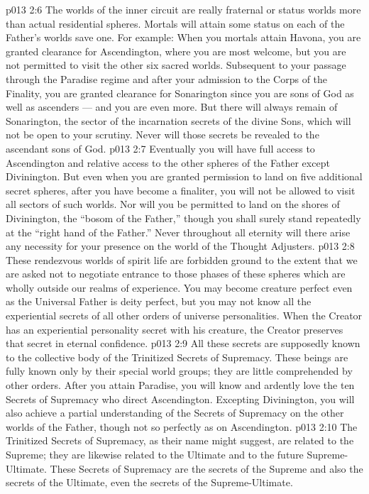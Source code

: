 \vs p013 2:6 \pc The worlds of the inner circuit are really fraternal or status worlds more than actual residential spheres. Mortals will attain some status on each of the Father’s worlds save one. For example: When you mortals attain Havona, you are granted clearance for Ascendington, where you are most welcome, but you are not permitted to visit the other six sacred worlds. Subsequent to your passage through the Paradise regime and after your admission to the Corps of the Finality, you are granted clearance for Sonarington since you are sons of God as well as ascenders --- and you are even more. But there will always remain  of Sonarington, the sector of the incarnation secrets of the divine Sons, which will not be open to your scrutiny. Never will those secrets be revealed to the ascendant sons of God.
\vs p013 2:7 Eventually you will have full access to Ascendington and relative access to the other spheres of the Father except Divinington. But even when you are granted permission to land on five additional secret spheres, after you have become a finaliter, you will not be allowed to visit all sectors of such worlds. Nor will you be permitted to land on the shores of Divinington, the “bosom of the Father,” though you shall surely stand repeatedly at the “right hand of the Father.” Never throughout all eternity will there arise any necessity for your presence on the world of the Thought Adjusters.
\vs p013 2:8 These rendezvous worlds of spirit life are forbidden ground to the extent that we are asked not to negotiate entrance to those phases of these spheres which are wholly outside our realms of experience. You may become creature perfect even as the Universal Father is deity perfect, but you may not know all the experiential secrets of all other orders of universe personalities. When the Creator has an experiential personality secret with his creature, the Creator preserves that secret in eternal confidence.
\vs p013 2:9 \pc All these secrets are supposedly known to the collective body of the Trinitized Secrets of Supremacy. These beings are fully known only by their special world groups; they are little comprehended by other orders. After you attain Paradise, you will know and ardently love the ten Secrets of Supremacy who direct Ascendington. Excepting Divinington, you will also achieve a partial understanding of the Secrets of Supremacy on the other worlds of the Father, though not so perfectly as on Ascendington.
\vs p013 2:10 The Trinitized Secrets of Supremacy, as their name might suggest, are related to the Supreme; they are likewise related to the Ultimate and to the future Supreme\hyp{}Ultimate. These Secrets of Supremacy are the secrets of the Supreme and also the secrets of the Ultimate, even the secrets of the Supreme\hyp{}Ultimate.
